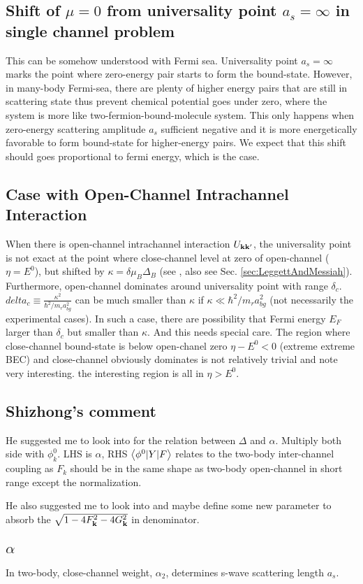 \subsection{Shift of $\mu=0$ from universality point $a_s=\infty$ in single channel problem}
This can be somehow understood with Fermi sea. Universality point $a_s=\infty$ marks the point where zero-energy pair starts to form the bound-state.  However, in many-body Fermi-sea, there are plenty of higher energy pairs that are still in scattering state thus prevent chemical potential goes under zero, where the system is more like two-fermion-bound-molecule system.  This only happens when zero-energy scattering amplitude $a_s$ sufficient negative and it is more energetically favorable to form bound-state for higher-energy pairs.  We expect that this shift should goes proportional to fermi energy, which is the case.  

\subsection{Case with Open-Channel Intrachannel Interaction}
When there is open-channel intrachannel interaction $U_{\mathbf{k}\mathbf{k}'}$, the universality point is not exact at the point where close-channel level at zero of open-channel ($\eta=E^0$), but shifted by $\kappa=\delta\mu_B\Delta_B$ (see \cite{Leggett}, also see Sec. \ref{sec:LeggettAndMessiah}).  Furthermore, open-channel dominates around universality point with range $\delta_c$.  $delta_c\equiv\frac{\kappa^2}{\hbar^2/m_ra_{bg}^2}$ can be much smaller than $\kappa$ if $\kappa\ll\hbar^2/m_ra_{bg}^2$ (not necessarily the experimental cases).  In such a case, there are possibility that Fermi energy $E_F$ larger than $\delta_c$ but smaller than $\kappa$.  And this needs special care.  The region where close-channel bound-state is below open-chanel zero $\eta-E^0<0$ (extreme extreme BEC) and close-channel obviously dominates is not relatively trivial and note very interesting.  the interesting region is all in $\eta>E^0$.  

\subsection{Shizhong's comment}
He suggested me to look into  for the relation between $\Delta$ and $\alpha$. Multiply both side with $\phi^0_k$.  LHS is $\alpha$, RHS $\bigl<{\phi^0{\lvert{Y}\rvert}F}\bigr>$ relates to the two-body inter-channel coupling as $F_k$ should be in the same shape as two-body open-channel in short range except the normalization.  

He also suggested me to look into  and maybe define some new parameter to absorb the $\sqrt{1-4 F_{\mathbf{k}}^2-4 G_{\mathbf{k}}^2}$ in denominator.  

\subsection{$\alpha$}
In two-body, close-channel weight, $\alpha_{2}$, determines s-wave scattering length $a_{s}$.  